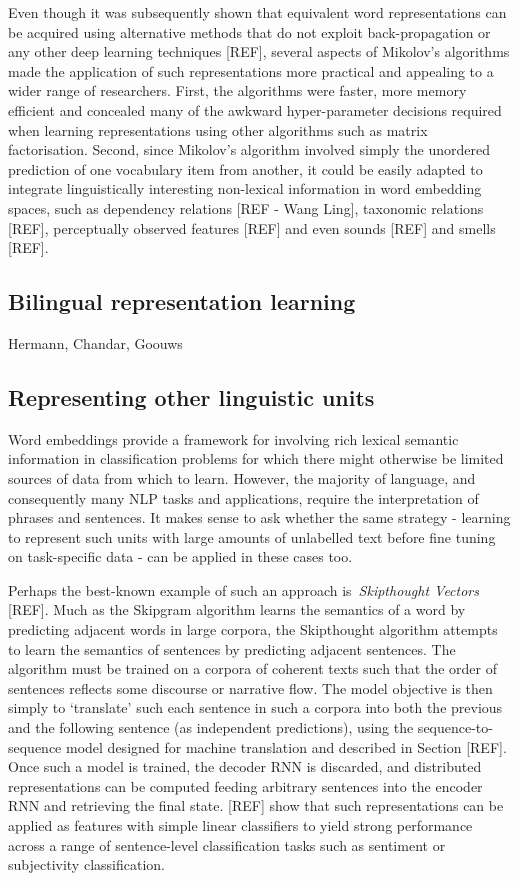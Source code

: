 \documentclass[11pt,letterpaper]{article}
\begin{document}
Even though it was subsequently shown that equivalent word representations can be acquired using alternative methods that do not exploit back-propagation or any other deep learning techniques [REF], several aspects of Mikolov's algorithms made the application of such representations more practical and appealing to a wider range of researchers. First, the algorithms were faster, more memory efficient and concealed many of the awkward hyper-parameter decisions required when learning representations using other algorithms such as matrix factorisation. Second, since Mikolov's algorithm involved simply the unordered prediction of one vocabulary item from another, it could be easily adapted to integrate linguistically interesting non-lexical information in word embedding spaces, such as dependency relations [REF - Wang Ling], taxonomic relations [REF], perceptually observed features [REF] and even sounds [REF] and smells [REF].   

\subsection{Bilingual representation learning}
Hermann, Chandar, Goouws

\subsection{Representing other linguistic units}
Word embeddings provide a framework for involving rich lexical semantic information in classification problems for which there might otherwise be limited sources of data from which to learn. However, the majority of language, and consequently many NLP tasks and applications, require the interpretation of phrases and sentences. It makes sense to ask whether the same strategy - learning to represent such units with large amounts of unlabelled text before fine tuning on task-specific data - can be applied in these cases too.

Perhaps the best-known example of such an approach is~\emph{Skipthought Vectors} [REF]. Much as the Skipgram algorithm learns the semantics of a word by predicting adjacent words in large corpora, the Skipthought algorithm attempts to learn the semantics of sentences by predicting adjacent sentences. The algorithm must be trained on a corpora of coherent texts such that the order of sentences reflects some discourse or narrative flow. The model objective is then simply to `translate'  such each sentence in such a corpora into both the previous and the following sentence (as independent predictions), using the sequence-to-sequence model designed for machine translation and described in Section [REF]. Once such a model is trained, the decoder RNN is discarded, and distributed representations can be computed feeding arbitrary sentences into the encoder RNN and retrieving the final state. [REF] show that such representations can be applied as features with simple linear classifiers to yield strong performance across a range of sentence-level classification tasks such as sentiment or subjectivity classification.
\end{document}
